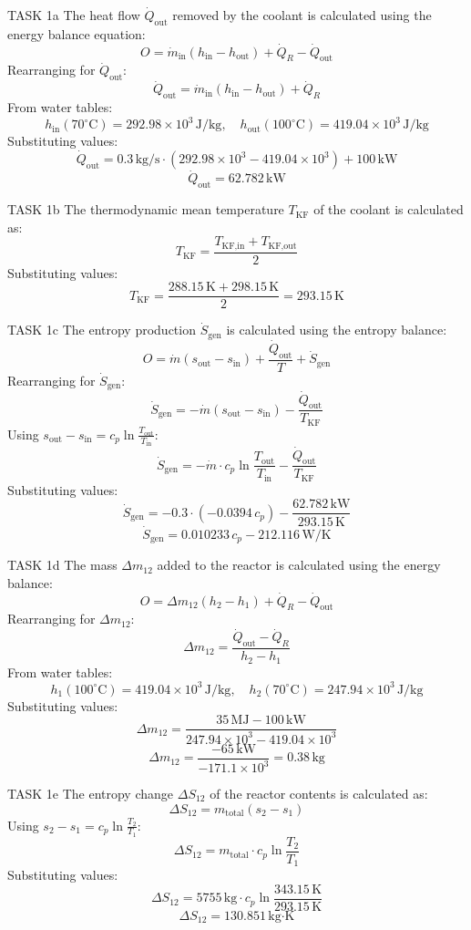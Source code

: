 TASK 1a  
The heat flow \( \dot{Q}_{\text{out}} \) removed by the coolant is calculated using the energy balance equation:  
\[
O = \dot{m}_{\text{in}} \left( h_{\text{in}} - h_{\text{out}} \right) + \dot{Q}_R - \dot{Q}_{\text{out}}
\]  
Rearranging for \( \dot{Q}_{\text{out}} \):  
\[
\dot{Q}_{\text{out}} = \dot{m}_{\text{in}} \left( h_{\text{in}} - h_{\text{out}} \right) + \dot{Q}_R
\]  
From water tables:  
\[
h_{\text{in}}(70^\circ\text{C}) = 292.98 \times 10^3 \, \text{J/kg}, \quad h_{\text{out}}(100^\circ\text{C}) = 419.04 \times 10^3 \, \text{J/kg}
\]  
Substituting values:  
\[
\dot{Q}_{\text{out}} = 0.3 \, \text{kg/s} \cdot \left( 292.98 \times 10^3 - 419.04 \times 10^3 \right) + 100 \, \text{kW}
\]  
\[
\dot{Q}_{\text{out}} = 62.782 \, \text{kW}
\]  

TASK 1b  
The thermodynamic mean temperature \( T_{\text{KF}} \) of the coolant is calculated as:  
\[
T_{\text{KF}} = \frac{T_{\text{KF,in}} + T_{\text{KF,out}}}{2}
\]  
Substituting values:  
\[
T_{\text{KF}} = \frac{288.15 \, \text{K} + 298.15 \, \text{K}}{2} = 293.15 \, \text{K}
\]  

TASK 1c  
The entropy production \( \dot{S}_{\text{gen}} \) is calculated using the entropy balance:  
\[
O = \dot{m} \left( s_{\text{out}} - s_{\text{in}} \right) + \frac{\dot{Q}_{\text{out}}}{T} + \dot{S}_{\text{gen}}
\]  
Rearranging for \( \dot{S}_{\text{gen}} \):  
\[
\dot{S}_{\text{gen}} = -\dot{m} \left( s_{\text{out}} - s_{\text{in}} \right) - \frac{\dot{Q}_{\text{out}}}{T_{\text{KF}}}
\]  
Using \( s_{\text{out}} - s_{\text{in}} = c_p \ln \frac{T_{\text{out}}}{T_{\text{in}}} \):  
\[
\dot{S}_{\text{gen}} = -\dot{m} \cdot c_p \ln \frac{T_{\text{out}}}{T_{\text{in}}} - \frac{\dot{Q}_{\text{out}}}{T_{\text{KF}}}
\]  
Substituting values:  
\[
\dot{S}_{\text{gen}} = -0.3 \cdot (-0.0394 \, c_p) - \frac{62.782 \, \text{kW}}{293.15 \, \text{K}}
\]  
\[
\dot{S}_{\text{gen}} = 0.010233 \, c_p - 212.116 \, \text{W/K}
\]  

TASK 1d  
The mass \( \Delta m_{12} \) added to the reactor is calculated using the energy balance:  
\[
O = \Delta m_{12} \left( h_2 - h_1 \right) + \dot{Q}_R - \dot{Q}_{\text{out}}
\]  
Rearranging for \( \Delta m_{12} \):  
\[
\Delta m_{12} = \frac{\dot{Q}_{\text{out}} - \dot{Q}_R}{h_2 - h_1}
\]  
From water tables:  
\[
h_1(100^\circ\text{C}) = 419.04 \times 10^3 \, \text{J/kg}, \quad h_2(70^\circ\text{C}) = 247.94 \times 10^3 \, \text{J/kg}
\]  
Substituting values:  
\[
\Delta m_{12} = \frac{35 \, \text{MJ} - 100 \, \text{kW}}{247.94 \times 10^3 - 419.04 \times 10^3}
\]  
\[
\Delta m_{12} = \frac{-65 \, \text{kW}}{-171.1 \times 10^3} = 0.38 \, \text{kg}
\]  

TASK 1e  
The entropy change \( \Delta S_{12} \) of the reactor contents is calculated as:  
\[
\Delta S_{12} = m_{\text{total}} \left( s_2 - s_1 \right)
\]  
Using \( s_2 - s_1 = c_p \ln \frac{T_2}{T_1} \):  
\[
\Delta S_{12} = m_{\text{total}} \cdot c_p \ln \frac{T_2}{T_1}
\]  
Substituting values:  
\[
\Delta S_{12} = 5755 \, \text{kg} \cdot c_p \ln \frac{343.15 \, \text{K}}{293.15 \, \text{K}}
\]  
\[
\Delta S_{12} = 130.851 \, \text{kg·K}
\]  